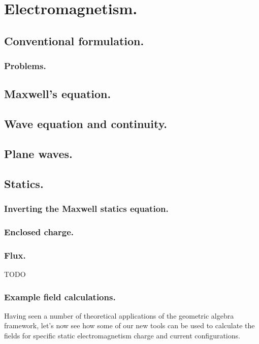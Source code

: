 %
%
   \chapter{Electromagnetism.}
      \section{Conventional formulation.}
         
         \subsection{Problems.}
            
      \section{Maxwell's equation.}
         
      \section{Wave equation and continuity.}
         
      \section{Plane waves.}
         
      \section{Statics.}
         \subsection{Inverting the Maxwell statics equation.}
            
         \subsection{Enclosed charge.}
            
         \subsection{Flux.}
            TODO
         \subsection{Example field calculations.}
            Having seen a number of theoretical applications of the geometric algebra framework, let's now see how some of our new tools can be used to calculate the fields for specific static electromagnetism charge and current configurations.
